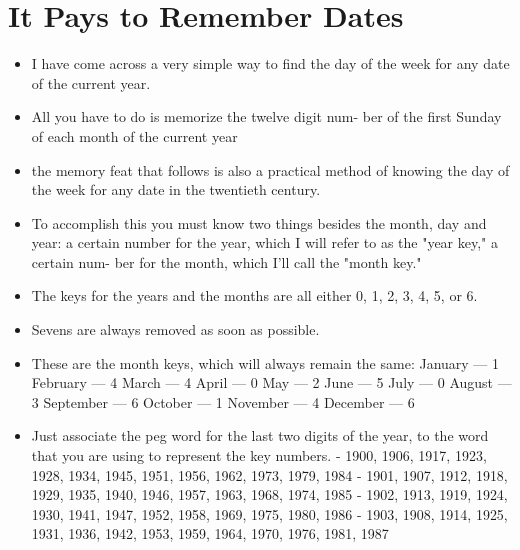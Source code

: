     \section*{It Pays to Remember Dates}
        \begin{itemize}
            \item I have come across a very simple way
            to find the day of the week for any date of the current
            year.
            \item All you have to do is memorize the twelve digit num-
            ber of the first Sunday of each month of the current year
            \item the memory feat that follows is also a
            practical method of knowing the day of the week for any
            date in the twentieth century.
            \item To accomplish this you must know two things besides
            the month, day and year:
                \subitem a certain number for the year,
                which I will refer to as the "year key,"
                \subitem a certain num-
                ber for the month, which I'll call the "month key."
            \item The keys for the
            years and the months are all either 0, 1, 2, 3, 4, 5, or 6.
            \item Sevens are always removed as soon as possible.
            \item These are the month keys, which will always remain the
            same:
                \subitem January — 1
                \subitem February — 4
                \subitem March — 4
                \subitem April — 0
                \subitem May — 2
                \subitem June — 5
                \subitem July — 0
                \subitem August — 3
                \subitem September — 6
                \subitem October — 1
                \subitem November — 4
                \subitem December — 6
            \item Just associate the peg word for the
            last two digits of the year, to the word that you are using to
            represent the key numbers.
                 - 1900, 1906, 1917, 1923, 1928, 1934, 1945, 1951, 1956, 1962, 1973, 1979, 1984
                 - 1901, 1907, 1912, 1918, 1929, 1935, 1940, 1946, 1957, 1963, 1968, 1974, 1985
                 - 1902, 1913, 1919, 1924, 1930, 1941, 1947, 1952, 1958, 1969, 1975, 1980, 1986
                 - 1903, 1908, 1914, 1925, 1931, 1936, 1942, 1953, 1959, 1964, 1970, 1976, 1981, 1987

\end{itemize}
